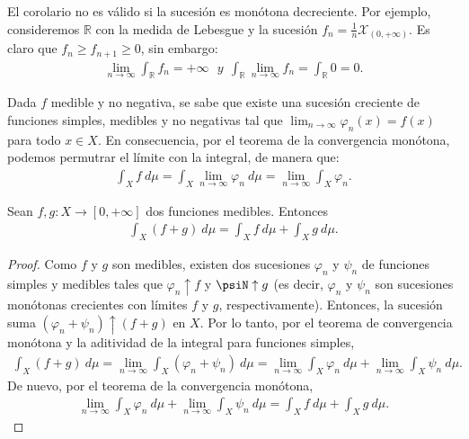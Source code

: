 \begin{obs}
El corolario no es válido si la sucesión es monótona decreciente. Por ejemplo, consideremos $\mathbb{R}$ con la medida de Lebesgue y la sucesión $f_n = \frac{1}{n}\mathcal{X}_{(0,+\infty)}$. Es claro que $f_n \ge f_{n+1} \ge 0$, sin embargo:
\begin{align*}
    \lim_{n \to \infty}{\int_{\mathbb{R}}{f_n} = +\infty} \ \ \ y \ \     \int_{\mathbb{R}}{\lim_{n \to \infty}{f_n}} = \int_{\mathbb{R}}{0} = 0. 
\end{align*}
\end{obs}

\begin{obs}
 Dada $f$ medible y no negativa, se sabe que existe una sucesión creciente de funciones simples, medibles y no negativas tal que $\lim_{n \to \infty}{\varphi_n(x) = f(x)}$ para todo $x \in X$. En consecuencia, por el teorema de la convergencia monótona, podemos permutrar el límite con la integral, de manera que:
 \begin{align*}
     \int_{X}{f \ d\mu} = \int_{X}{\lim_{n \to \infty}{\varphi_n} \ d\mu} = \lim_{n \to \infty}{\int_{X}{\varphi_n}}.
 \end{align*}
 \end{obs}
 \begin{prop}
 Sean $f,g: X \longrightarrow [0,+\infty]$ dos funciones medibles. Entonces
 \begin{align*}
     \int_{X}{(f+g) \ d\mu} = \int_{X}{f \ d\mu} + \int_{X}{g \ d\mu}.
 \end{align*}
 \end{prop}
 
 \begin{proof}
 Como $f$ y $g$ son medibles, existen dos sucesiones $\varphi_n$ y $\psi_n$ de funciones simples y medibles tales que $\varphi_n \uparrow f$ y $\psiN \uparrow g$ (es decir, $\varphi_n$ y $\psi_n$ son sucesiones monótonas crecientes con límites $f$ y $g$, respectivamente). Entonces, la sucesión suma $(\varphi_n + \psi_n) \uparrow (f+g)$ en $X$. Por lo tanto, por el teorema de convergencia monótona y la aditividad de la integral para funciones simples,
 \begin{align*}
     \int_{X}{(f+g) \ d\mu} = \lim_{n \to \infty}{\int_{X}{(\varphi_n + \psi_n)} \ d\mu} = \lim_{n \to \infty}{\int_{X}{\varphi_n} \ d\mu} + \lim_{n \to \infty}{\int_{X}{\psi_n} \ d\mu}.
\end{align*}
 De nuevo, por el teorema de la convergencia monótona,
\begin{align*}
     \lim_{n \to \infty}{\int_{X}{\varphi_n} \ d\mu} + \lim_{n \to \infty}{\int_{X}{\psi_n} \ d\mu} = \int_{X}{f \ d\mu} + \int_{X}{g \ d\mu}.
\end{align*}
\end{proof}

